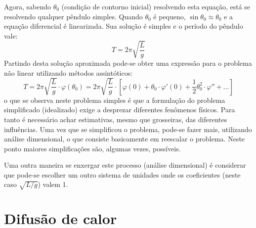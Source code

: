 Agora, sabendo $\theta_0$ (condição de contorno inicial) resolvendo esta equação, está se resolvendo qualquer pêndulo simples. Quando $\theta_0$ é pequeno, $\sin\theta_0\approx\theta_0$ e a equação diferencial é linearizada. Sua solução é simples e o período do pêndulo vale:
\[
T = 2\pi\sqrt{\frac{L}{g}}
\]
Partindo desta solução aproximada pode-se obter uma expressão para o problema não linear utilizando métodos assintóticos:
\[
T = 2\pi\sqrt{\frac{L}{g}}\cdot\varphi(\theta_0) = 2\pi \sqrt{\frac{L}{g}} \cdot\left[\varphi(0) + \theta_0\cdot\varphi'(0) +
\frac{1}{2}\theta_0^2\cdot\varphi'' + \ldots\right]
\]
o que se observa neste problema simples é que a formulação do problema simplificado (idealizado) exige a desprezar diferentes fenômenos físicos. Para tanto é necessário achar estimativas, mesmo que grosseiras, das diferentes influências. Uma vez que se simplificou o problema, pode-se fazer mais, utilizando análise dimensional, o que consiste basicamente em reescalar o problema. Neste ponto maiores simplificações são, algumas vezes, possíveis.

Uma outra maneira se enxergar este processo (análise dimensional) é considerar que pode-se escolher um outro sistema de unidades onde os coeficientes (neste caso $\sqrt{L/g}$) valem 1.

\section{Difusão de calor}

